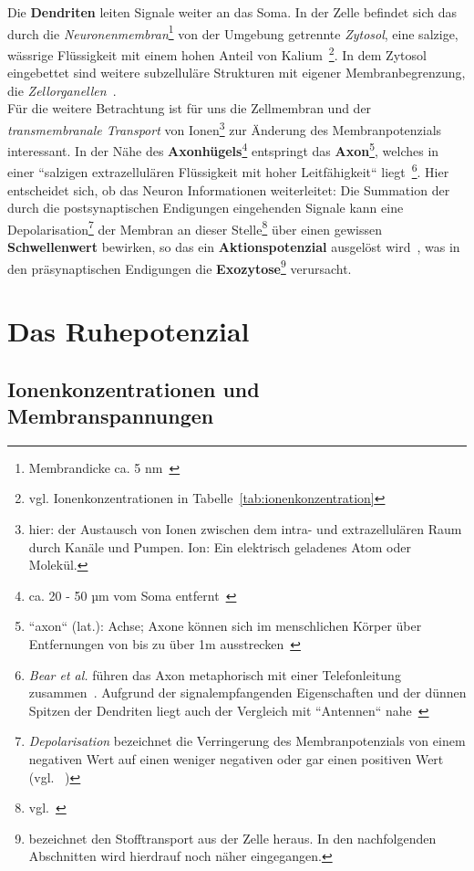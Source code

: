 Die \textbf{Dendriten} leiten Signale weiter an das Soma.
In der Zelle befindet sich das durch die \textit{Neuronenmembran}\footnote{
 Membrandicke ca. 5 nm~\cite[66]{FE19}
} von der Umgebung getrennte \textit{Zytosol}, eine salzige, wässrige Flüssigkeit mit einem hohen Anteil von Kalium~\cite[29]{BCP18}\footnote{
 vgl. Ionenkonzentrationen in Tabelle~\ref{tab:ionenkonzentration}
}.
In dem Zytosol eingebettet sind weitere subzelluläre Strukturen mit eigener Membranbegrenzung, die \textit{Zellorganellen}~\cite[8]{SD07}.\\
Für die weitere Betrachtung ist für uns die Zellmembran und der \textit{transmembranale Transport} von Ionen\footnote{
 hier: der Austausch von Ionen zwischen dem intra- und extrazellulären Raum durch Kanäle und Pumpen. Ion: Ein elektrisch geladenes Atom oder Molekül.
} zur Änderung des Membranpotenzials interessant. In der Nähe des \textbf{Axonhügels}\footnote{
 ca. 20 - 50 µm vom Soma entfernt~\cite[77]{Jon19}
} entspringt das \textbf{Axon}\footnote{
 ``axon`` (lat.): Achse; Axone können sich im menschlichen Körper über Entfernungen von bis zu über 1m ausstrecken~\cite[28]{BCP18}
}, welches in einer ``salzigen extrazellulären Flüssigkeit mit hoher Leitfähigkeit`` liegt~\cite[61]{BCP18}\footnote{
  \textit{Bear et al.} führen das Axon metaphorisch mit einer Telefonleitung zusammen~\cite[43]{BCP18}. Aufgrund der signalempfangenden Eigenschaften und der dünnen Spitzen der Dendriten liegt auch der Vergleich mit ``Antennen`` nahe~\cite[28]{BCP18}
}.
Hier entscheidet sich, ob das Neuron Informationen weiterleitet: Die Summation der durch die postsynaptischen Endigungen eingehenden Signale kann eine Depolarisation\footnote{
  \textit{Depolarisation} bezeichnet die Verringerung des Membranpotenzials von einem negativen Wert auf einen weniger negativen oder gar einen positiven Wert (vgl. ~\cite[95 f.]{SBB+13})
} der Membran an dieser Stelle\footnote{vgl.~\cite[61]{Eil19}} über einen gewissen \textbf{Schwellenwert} bewirken, so das ein \textbf{Aktionspotenzial} ausgelöst wird~\cite[142 f.]{BCP18}, was in den präsynaptischen Endigungen die \textbf{Exozytose}\footnote{
  bezeichnet den Stofftransport aus der Zelle heraus. In den nachfolgenden Abschnitten wird hierdrauf noch näher eingegangen.
} verursacht.


\section{Das Ruhepotenzial}

\subsection{Ionenkonzentrationen und Membranspannungen}\label{sec-ionenkonzentrationen}

